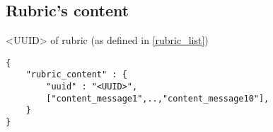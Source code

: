 \documentclass[a4paper]{article}
\begin{document}
\subsection{Rubric's content}
<UUID> of rubric (as defined in \ref{rubric_list})

\begin{lstlisting}
{
    "rubric_content" : {
		"uuid" : "<UUID>",
		["content_message1",..,"content_message10"],
    }
}
\end{lstlisting}





%
%
%
%
%
%
%
%
\end{document}
